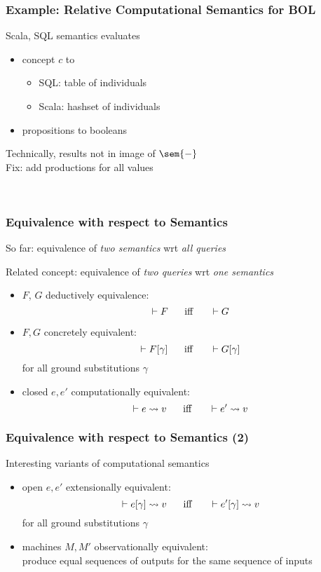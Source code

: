 \begin{frame}\frametitle{Example: Relative Computational Semantics for BOL}
Scala, SQL semantics evaluates
\begin{itemize}
\item concept $c$ to
\begin{itemize}
\item SQL: table of individuals
\item Scala: hashset of individuals
\end{itemize}
\item propositions to booleans 
\end{itemize}

Technically, results not in image of $\sem{-}$\\
Fix: add productions for all values
\begin{commgrammar}
\\
\end{commgrammar}
\end{frame}

\begin{frame}\frametitle{Equivalence with respect to Semantics}
So far: equivalence of \emph{two semantics} wrt \emph{all queries}

Related concept: equivalence of \emph{two queries} wrt \emph{one semantics}
\begin{itemize}
\item $F$, $G$ deductively equivalence: \[\vdash F \hspace*{.5cm}\;\mathrm{iff}\;\hspace*{.5cm} \vdash G\]
\item $F,G$ concretely equivalent: \[\vdash F[\gamma] \hspace*{.5cm}\;\mathrm{iff}\;\hspace*{.5cm} \vdash G[\gamma]\] for all ground substitutions $\gamma$
\item closed $e,e'$ computationally equivalent: \[\vdash e\rightsquigarrow v \hspace*{.5cm}\;\mathrm{iff}\;\hspace*{.5cm} \vdash e'\rightsquigarrow v\]
\end{itemize}
\end{frame}

\begin{frame}\frametitle{Equivalence with respect to Semantics (2)}
Interesting variants of computational semantics
\begin{itemize}
\item open $e,e'$ extensionally equivalent:
  \[\vdash e[\gamma]\rightsquigarrow v \hspace*{.5cm}\;\mathrm{iff}\;\hspace*{.5cm} \vdash e'[\gamma]\rightsquigarrow v\]
  for all ground substitutions $\gamma$
\item machines $M,M'$ observationally equivalent: \\
  produce equal sequences of outputs for the same sequence of inputs
\end{itemize}

\end{frame}

